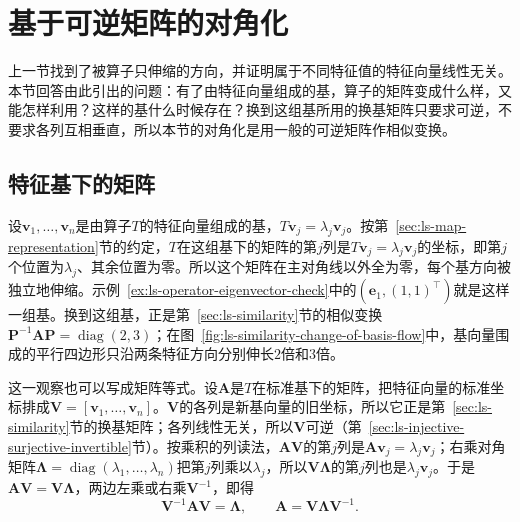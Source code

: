 
\section{基于可逆矩阵的对角化}
\label{sec:ls-matrix-powers}
\label{sec:ch06-powers-spectrum}

上一节找到了被算子只伸缩的方向，并证明属于不同特征值的特征向量线性无关。本节回答由此引出的问题：有了由特征向量组成的基，算子的矩阵变成什么样，又能怎样利用？这样的基什么时候存在？换到这组基所用的换基矩阵只要求可逆，不要求各列互相垂直，所以本节的对角化是用一般的可逆矩阵作相似变换。

\subsection{特征基下的矩阵}
\label{sec:matrix-analysis-spectrum}

设$\bm v_1,\ldots,\bm v_n$是由算子$T$的特征向量组成的基，$T\bm v_j=\lambda_j\bm v_j$。按第~\ref{sec:ls-map-representation}节的约定，$T$在这组基下的矩阵的第$j$列是$T\bm v_j=\lambda_j\bm v_j$的坐标，即第$j$个位置为$\lambda_j$、其余位置为零。所以这个矩阵在主对角线以外全为零，每个基方向被独立地伸缩。示例~\ref{ex:ls-operator-eigenvector-check}中的$(\bm e_1,(1,1)^{\top})$就是这样一组基。换到这组基，正是第~\ref{sec:ls-similarity}节的相似变换$\bm P^{-1}\bm A\bm P=\operatorname{diag}(2,3)$；在图~\ref{fig:ls-similarity-change-of-basis-flow}中，基向量围成的平行四边形只沿两条特征方向分别伸长$2$倍和$3$倍。

这一观察也可以写成矩阵等式。设$\bm A$是$T$在标准基下的矩阵，把特征向量的标准坐标排成$\bm V=[\bm v_1,\ldots,\bm v_n]$。$\bm V$的各列是新基向量的旧坐标，所以它正是第~\ref{sec:ls-similarity}节的换基矩阵；各列线性无关，所以$\bm V$可逆（第~\ref{sec:ls-injective-surjective-invertible}节）。按乘积的列读法，$\bm A\bm V$的第$j$列是$\bm A\bm v_j=\lambda_j\bm v_j$；右乘对角矩阵$\bm\Lambda=\operatorname{diag}(\lambda_1,\ldots,\lambda_n)$把第$j$列乘以$\lambda_j$，所以$\bm V\bm\Lambda$的第$j$列也是$\lambda_j\bm v_j$。于是$\bm A\bm V=\bm V\bm\Lambda$，两边左乘或右乘$\bm V^{-1}$，即得
\[
 \bm V^{-1}\bm A\bm V=\bm\Lambda,\qquad \bm A=\bm V\bm\Lambda\bm V^{-1}.
\]

